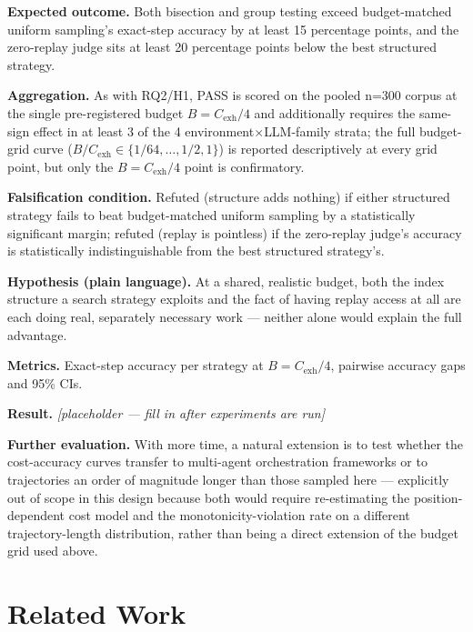 \documentclass[11pt]{article}
\newcommand{\ph}{\textit{[placeholder --- fill in after experiments are run]}}
\begin{document}
\textbf{Expected outcome.} Both bisection and group testing exceed budget-matched uniform sampling's exact-step accuracy by at least 15 percentage points, and the zero-replay judge sits at least 20 percentage points below the best structured strategy.

\textbf{Aggregation.} As with RQ2/H1, PASS is scored on the pooled n=300 corpus at the single pre-registered budget $B=C_{\mathrm{exh}}/4$ and additionally requires the same-sign effect in at least 3 of the 4 environment$\times$LLM-family strata; the full budget-grid curve ($B/C_{\mathrm{exh}}\in\{1/64,\dots,1/2,1\}$) is reported descriptively at every grid point, but only the $B=C_{\mathrm{exh}}/4$ point is confirmatory.

\textbf{Falsification condition.} Refuted (structure adds nothing) if either structured strategy fails to beat budget-matched uniform sampling by a statistically significant margin; refuted (replay is pointless) if the zero-replay judge's accuracy is statistically indistinguishable from the best structured strategy's.

\textbf{Hypothesis (plain language).} At a shared, realistic budget, both the index structure a search strategy exploits and the fact of having replay access at all are each doing real, separately necessary work --- neither alone would explain the full advantage.

\textbf{Metrics.} Exact-step accuracy per strategy at $B=C_{\mathrm{exh}}/4$, pairwise accuracy gaps and 95\% CIs.

\textbf{Result.} \ph

\vspace{0.5em}
\noindent\textbf{Further evaluation.} With more time, a natural extension is to test whether the cost-accuracy curves transfer to multi-agent orchestration frameworks or to trajectories an order of magnitude longer than those sampled here --- explicitly out of scope in this design because both would require re-estimating the position-dependent cost model and the monotonicity-violation rate on a different trajectory-length distribution, rather than being a direct extension of the budget grid used above.

\section{Related Work}
\end{document}
